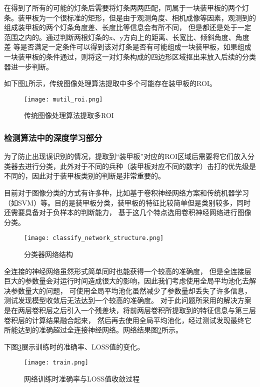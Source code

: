 在得到了所有的可能的灯条后需要将灯条两两匹配，同属于一块装甲板的两个灯条。装甲板为一个很标准的矩形，但是由于观测角度、相机成像等因素，观测到的组成装甲板的两个灯条角度差、长度比等信息会有所不同，
但是都还是处于一定范围之内的。通过判断两根灯条的x、y方向上的距离、长宽比、倾斜角度、角度差
等是否满足一定条件可以得到该对灯条是否有可能组成一块装甲板，如果组成一块装甲板的条件通过，则将这一对灯条构成的四边形区域抠出来放入后续的分类器进一步判断。\par
如下图\ref{传统图像处理算法提取多ROI}所示，传统图像处理算法提取中多个可能存在装甲板的ROI。

\begin{figure}[H]
    \centering
    \texttt{[image: mutil\_roi.png]} 
    \caption{传统图像处理算法提取多ROI} 
    \label{传统图像处理算法提取多ROI}
\end{figure}

\subsubsection{检测算法中的深度学习部分}

为了防止出现误识别的情况，提取到“装甲板”对应的ROI区域后需要将它们放入分类器去进行分类，此外对于不同的兵种（装甲板对应不同的数字）击打的优先级是不同的，因此对于装甲板类别的判断是非常重要的。\par
目前对于图像分类的方式有许多种，比如基于卷积神经网络\cite{krizhevsky2017imagenet}方案和传统机器学习（如SVM\cite{cortes1995support}）等。目的是装甲板分类，装甲板的特征比较简单但是类别较多，同时还需要具备对于负样本的判断能力，
基于这几个特点选用卷积神经网络进行图像分类。
\begin{figure}[H]
    \centering
    \texttt{[image: classify\_network\_structure.png]} 
    \caption{分类器网络结构} 
    \label{分类器网络结构}
\end{figure}
全连接的神经网络虽然形式简单同时也能获得一个较高的准确度，
但是全连接层巨大的参数量会对运行时间造成很大的影响，因此我们考虑使用全局平均池化去解决参数量大的问题，
可使用全局平均池化虽然减少了参数量却丢失了许多信息，测试发现模型收敛后无法达到一个较高的准确度。
对于此问题所采用的解决方案是在两层卷积层之后引入一个残差块\cite{he2016deep}，将前两层卷积所提取到的特征信息与第三层卷积层的计算结果融合起来，
然后再去使用全局平均池化，经过测试发现最终它所能达到的准确超过全连接神经网络。网络结果图\ref{分类器网络结构}所示。


下图\ref{网络训练时准确率与LOSS值收敛过程}展示训练时的准确率、LOSS值的变化。
\begin{figure}[H]
    \centering
    \texttt{[image: train.png]} 
    \caption{网络训练时准确率与LOSS值收敛过程} 
    \label{网络训练时准确率与LOSS值收敛过程}
\end{figure}



